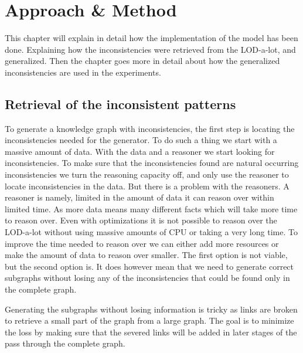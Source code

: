 \documentclass{article}
\begin{document}
\newpage
\section{Approach \& Method}
This chapter will explain in detail how the implementation of the model has been done. Explaining how the inconsistencies were retrieved from the LOD-a-lot, and generalized. Then the chapter goes more in detail about how the generalized inconsistencies are used in the experiments. 

\subsection{Retrieval of the inconsistent patterns}
To generate a knowledge graph with inconsistencies, the first step is locating the inconsistencies needed for the generator. To do such a thing we start with a massive amount of data. With the data and a reasoner we start looking for inconsistencies. To make sure that the inconsistencies found are natural occurring inconsistencies we turn the reasoning capacity off, and only use the reasoner to locate inconsistencies in the data. But there is a problem with the reasoners. A reasoner is namely,  limited in the amount of data it can reason over within limited time. As more data means many different facts which will take more time to reason over. Even with optimizations it is not possible to reason over the LOD-a-lot without using massive amounts of CPU or taking a very long time. To improve the time needed to reason over we can either add more resources or make the amount of data to reason over smaller. The first option is not viable, but the second option is. 
It does however mean that we need to generate correct subgraphs without losing any of the inconsistencies that could be found only in the complete graph.

Generating the subgraphs without losing information is tricky as links are broken to retrieve a small part of the graph from a large graph. The goal is to minimize the loss by making sure that the severed links will be added in later stages of the pass through the complete graph.
\end{document}
